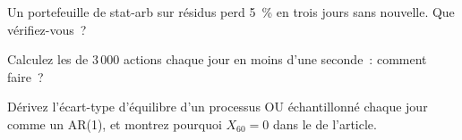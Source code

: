 \begin{interviewq}\label{iq:s1:residual-and-principal-component-stat-arb:4}
Un portefeuille de stat-arb sur résidus perd 5~\% en trois jours sans nouvelle. Que vérifiez-vous~?
\end{interviewq}

\begin{interviewq}\label{iq:s1:residual-and-principal-component-stat-arb:5}
Calculez les  de 3\,000 actions chaque jour en moins d'une seconde~: comment faire~?
\end{interviewq}

\begin{interviewq}\label{iq:s1:residual-and-principal-component-stat-arb:6}
Dérivez l'écart-type d'équilibre d'un processus OU échantillonné chaque jour comme un AR(1), et montrez pourquoi $X_{60} = 0$ dans le  de l'article.
\end{interviewq}

